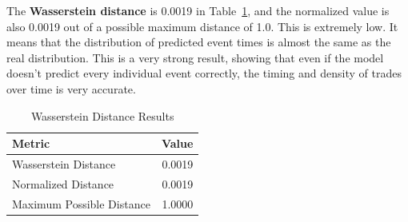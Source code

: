 The \textbf{Wasserstein distance} is 0.0019 in Table~\ref{tb:wasserstein-results}, and the normalized value is also 0.0019 out of a possible maximum distance of 1.0. This is extremely low. It means that the distribution of predicted event times is almost the same as the real distribution. This is a very strong result, showing that even if the model doesn't predict every individual event correctly, the timing and density of trades over time is very accurate.
\begin{table}[H]
    \centering
    \caption{Wasserstein Distance Results}
    \label{tb:wasserstein-results}
    \begin{tabular}{lr}
    \toprule
    Metric & Value \\
    \midrule
    Wasserstein Distance & 0.0019 \\
    Normalized Distance & 0.0019 \\
    Maximum Possible Distance & 1.0000 \\
    \bottomrule
    \end{tabular}
\end{table}


